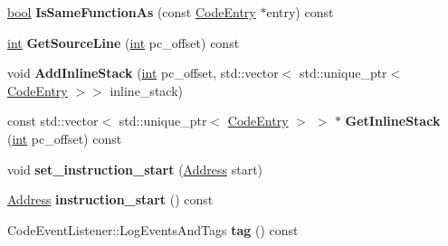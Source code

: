 \begin{DoxyCompactItemize}
\mbox{\label{classv8_1_1internal_1_1CodeEntry_a2083c5f581cbce6e70f2341ed9fb7d11}} 
\mbox{\hyperlink{classbool}{bool}} {\bfseries Is\+Same\+Function\+As} (const \mbox{\hyperlink{classv8_1_1internal_1_1CodeEntry}{Code\+Entry}} $\ast$entry) const
\item 
\mbox{\label{classv8_1_1internal_1_1CodeEntry_abe5b05a42c59591ff122d293bf484789}} 
\mbox{\hyperlink{classint}{int}} {\bfseries Get\+Source\+Line} (\mbox{\hyperlink{classint}{int}} pc\+\_\+offset) const
\item 
\mbox{\label{classv8_1_1internal_1_1CodeEntry_aa6e91ec1028fa9e3422a908027b7bb74}} 
void {\bfseries Add\+Inline\+Stack} (\mbox{\hyperlink{classint}{int}} pc\+\_\+offset, std\+::vector$<$ std\+::unique\+\_\+ptr$<$ \mbox{\hyperlink{classv8_1_1internal_1_1CodeEntry}{Code\+Entry}} $>$$>$ inline\+\_\+stack)
\item 
\mbox{\label{classv8_1_1internal_1_1CodeEntry_a5eeeb30d558dd37c29055fb7780d5b0a}} 
const std\+::vector$<$ std\+::unique\+\_\+ptr$<$ \mbox{\hyperlink{classv8_1_1internal_1_1CodeEntry}{Code\+Entry}} $>$ $>$ $\ast$ {\bfseries Get\+Inline\+Stack} (\mbox{\hyperlink{classint}{int}} pc\+\_\+offset) const
\item 
\mbox{\label{classv8_1_1internal_1_1CodeEntry_aa168b0f0ab774675546e16c847c4274c}} 
void {\bfseries set\+\_\+instruction\+\_\+start} (\mbox{\hyperlink{classuintptr__t}{Address}} start)
\item 
\mbox{\label{classv8_1_1internal_1_1CodeEntry_af8c3242d2d0cb69fd51df0bea826dc76}} 
\mbox{\hyperlink{classuintptr__t}{Address}} {\bfseries instruction\+\_\+start} () const
\item 
\mbox{\label{classv8_1_1internal_1_1CodeEntry_a5d2796418bd503a5be93e362c43358a8}} 
Code\+Event\+Listener\+::\+Log\+Events\+And\+Tags {\bfseries tag} () const
\end{DoxyCompactItemize}
